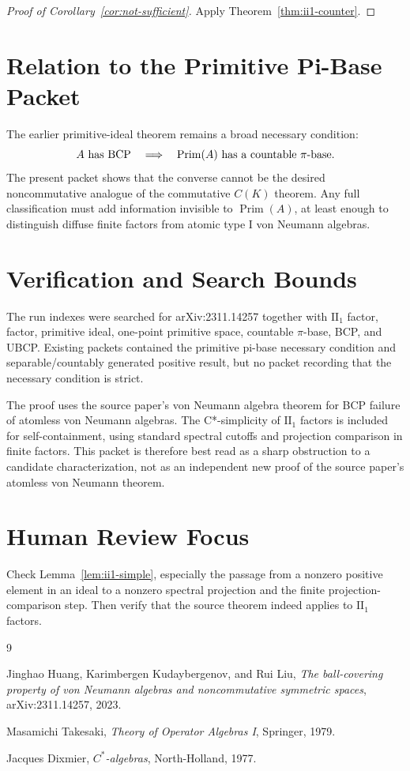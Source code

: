 \documentclass[11pt]{article}
\newcommand{\Prim}{\operatorname{Prim}}
\begin{document}
\begin{proof}[Proof of Corollary~\ref{cor:not-sufficient}]
Apply Theorem~\ref{thm:ii1-counter}.
\end{proof}

\section*{Relation to the Primitive Pi-Base Packet}

The earlier primitive-ideal theorem remains a broad necessary condition:
\[
        A\hbox{ has BCP}\quad\Longrightarrow\quad
        \Prim(A)\hbox{ has a countable }\pi\hbox{-base}.
\]
The present packet shows that the converse cannot be the desired
noncommutative analogue of the commutative \(C(K)\) theorem.  Any full
classification must add information invisible to \(\Prim(A)\), at least
enough to distinguish diffuse finite factors from atomic type I von Neumann
algebras.

\section*{Verification and Search Bounds}

The run indexes were searched for arXiv:2311.14257 together with
\(\mathrm{II}_1\) factor, factor, primitive ideal, one-point primitive space,
countable \(\pi\)-base, BCP, and UBCP.  Existing packets contained the
primitive pi-base necessary condition and separable/countably generated
positive result, but no packet recording that the necessary condition is
strict.

The proof uses the source paper's von Neumann algebra theorem for BCP failure
of atomless von Neumann algebras.  The C*-simplicity of \(\mathrm{II}_1\)
factors is included for self-containment, using standard spectral cutoffs and
projection comparison in finite factors.  This packet is therefore best read
as a sharp obstruction to a candidate characterization, not as an independent
new proof of the source paper's atomless von Neumann theorem.

\section*{Human Review Focus}

Check Lemma~\ref{lem:ii1-simple}, especially the passage from a nonzero
positive element in an ideal to a nonzero spectral projection and the finite
projection-comparison step.  Then verify that the source theorem indeed
applies to \(\mathrm{II}_1\) factors.

\begin{thebibliography}{9}

Jinghao Huang, Karimbergen Kudaybergenov, and Rui Liu,
\emph{The ball-covering property of von Neumann algebras and noncommutative
symmetric spaces},
arXiv:2311.14257, 2023.

Masamichi Takesaki,
\emph{Theory of Operator Algebras I},
Springer, 1979.

Jacques Dixmier,
\emph{\(C^*\)-algebras},
North-Holland, 1977.

\end{thebibliography}
\end{document}
